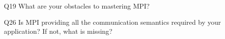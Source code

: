 \begin{description}%
\item{Q19} What are your obstacles to mastering MPI?%
\item{Q26} Is MPI providing all the communication semantics required by your application? If not, what is missing?%
\end{description}%

